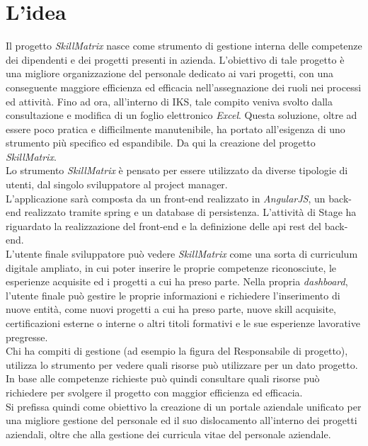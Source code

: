 
\section{L'idea}

Il progetto \emph{SkillMatrix} nasce come strumento di gestione interna delle competenze dei dipendenti e dei progetti presenti in azienda. L'obiettivo di tale progetto è una migliore organizzazione del personale dedicato ai vari progetti, con una conseguente maggiore efficienza ed efficacia nell'assegnazione dei ruoli nei processi ed attività. Fino ad ora, all'interno di IKS, tale compito veniva svolto dalla consultazione e modifica di un foglio elettronico \emph{Excel}. Questa soluzione, oltre ad essere poco pratica e difficilmente manutenibile, ha portato all'esigenza di uno strumento più specifico ed espandibile. Da qui la creazione del progetto \emph{SkillMatrix}.\\
Lo strumento \emph{SkillMatrix} è pensato per essere utilizzato da diverse tipologie di utenti, dal singolo sviluppatore al project manager.\\
L'applicazione sarà composta da un \gls{front-end} realizzato in \emph{AngularJS}, un \gls{back-end} realizzato tramite \gls{spring} e un database di persistenza. L'attività di Stage ha riguardato la realizzazione del \gls{front-end} e la definizione delle \gls{api} \gls{rest} del \gls{back-end}.\\
L'utente finale sviluppatore può vedere \emph{SkillMatrix} come una sorta di curriculum digitale ampliato, in cui poter inserire le proprie competenze riconosciute, le esperienze acquisite ed i progetti a cui ha preso parte. Nella propria \emph{dashboard}, l'utente finale può gestire le proprie informazioni e richiedere l'inserimento di nuove entità, come nuovi progetti a cui ha preso parte, nuove skill acquisite, certificazioni esterne o interne o altri titoli formativi e le sue esperienze lavorative pregresse.\\ 
Chi ha compiti di gestione (ad esempio la figura del Responsabile di progetto), utilizza lo strumento per vedere quali risorse può utilizzare per un dato progetto. In base alle competenze richieste può quindi consultare quali risorse può richiedere per svolgere il progetto con maggior efficienza ed efficacia.\\ 
Si prefissa quindi come obiettivo la creazione di un portale aziendale unificato per una migliore gestione del personale ed il suo dislocamento all’interno dei progetti aziendali, oltre che alla gestione dei curricula vitae del personale aziendale.\\
